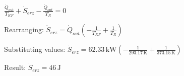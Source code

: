 \( \frac{\dot{Q}_{out}}{T_{KF}} + \dot{S}_{erz} - \frac{\dot{Q}_{out}}{T_R} = 0 \)  

Rearranging:  
\( \dot{S}_{erz} = \dot{Q}_{out} \left( -\frac{1}{T_{KF}} + \frac{1}{T_R} \right) \)  

Substituting values:  
\( \dot{S}_{erz} = 62.33 \, \text{kW} \left( -\frac{1}{293.17 \, \text{K}} + \frac{1}{373.15 \, \text{K}} \right) \)  

Result:  
\( \dot{S}_{erz} = 46 \, \text{J} \)